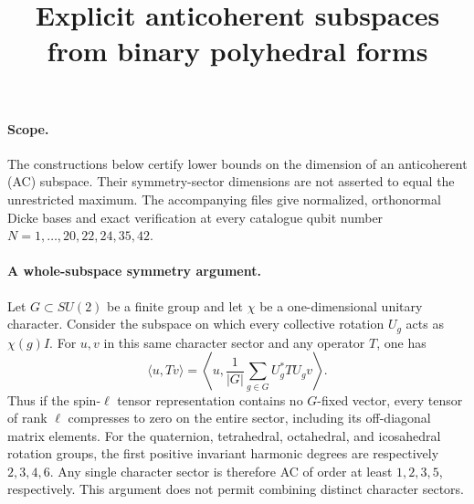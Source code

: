\documentclass[11pt]{article}
\title{Explicit anticoherent subspaces from binary polyhedral forms}
\author{}
\date{}
\begin{document}
\maketitle

\paragraph{Scope.}
The constructions below certify lower bounds on the dimension of an
anticoherent (AC) subspace. Their symmetry-sector dimensions are not asserted
to equal the unrestricted maximum. The accompanying files give normalized,
orthonormal Dicke bases and exact verification at every catalogue qubit
number $N=1,\ldots,20,22,24,35,42$.

\paragraph{A whole-subspace symmetry argument.}
Let $G\subset SU(2)$ be a finite group and let $\chi$ be a one-dimensional
unitary character. Consider the subspace on which every collective rotation
$U_g$ acts as $\chi(g)I$. For $u,v$ in this same character sector and any
operator $T$, one has
\[
 \langle u,Tv\rangle
 =\left\langle u,\frac1{|G|}\sum_{g\in G}U_g^*TU_gv\right\rangle.
\]
Thus if the spin-$\ell$ tensor representation contains no $G$-fixed vector,
every tensor of rank $\ell$ compresses to zero on the entire sector, including
its off-diagonal matrix elements. For the quaternion, tetrahedral,
octahedral, and icosahedral rotation groups, the first positive invariant
harmonic degrees are respectively $2,3,4,6$. Any single character sector is
therefore AC of order at least $1,2,3,5$, respectively. This argument does not
permit combining distinct character sectors.
\end{document}
